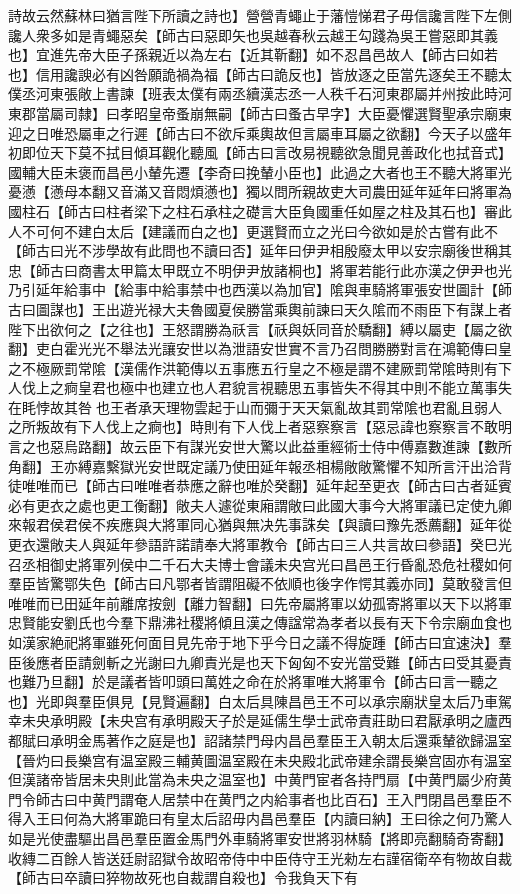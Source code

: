 詩故云然蘇林曰猶言陛下所讀之詩也】營營青蠅止于藩愷悌君子毋信讒言陛下左側讒人衆多如是青蠅惡矣【師古曰惡即矢也吳越春秋云越王勾踐為吳王嘗惡即其義也】宜進先帝大臣子孫親近以為左右【近其靳翻】如不忍昌邑故人【師古曰如若也】信用讒諛必有凶咎願詭禍為福【師古曰詭反也】皆放逐之臣當先逐矣王不聽太僕丞河東張敞上書諫【班表太僕有兩丞續漢志丞一人秩千石河東郡屬并州按此時河東郡當屬司隸】曰孝昭皇帝蚤崩無嗣【師古曰蚤古早字】大臣憂懼選賢聖承宗廟東迎之日唯恐屬車之行遲【師古曰不欲斥乘輿故但言屬車耳屬之欲翻】今天子以盛年初即位天下莫不拭目傾耳觀化聽風【師古曰言改易視聽欲急聞見善政化也拭音式】國輔大臣未褒而昌邑小輦先遷【李奇曰挽輦小臣也】此過之大者也王不聽大將軍光憂懣【懣母本翻又音滿又音悶煩懣也】獨以問所親故吏大司農田延年延年曰將軍為國柱石【師古曰柱者梁下之柱石承柱之礎言大臣負國重任如屋之柱及其石也】審此人不可何不建白太后【建議而白之也】更選賢而立之光曰今欲如是於古嘗有此不【師古曰光不涉學故有此問也不讀曰否】延年曰伊尹相殷廢太甲以安宗廟後世稱其忠【師古曰商書太甲篇太甲既立不明伊尹放諸桐也】將軍若能行此亦漢之伊尹也光乃引延年給事中【給事中給事禁中也西漢以為加官】隂與車騎將軍張安世圖計【師古曰圖謀也】王出遊光禄大夫魯國夏侯勝當乘輿前諫曰天久隂而不雨臣下有謀上者陛下出欲何之【之往也】王怒謂勝為祅言【祅與妖同音於驕翻】縛以屬吏【屬之欲翻】吏白霍光光不舉法光讓安世以為泄語安世實不言乃召問勝勝對言在鴻範傳曰皇之不極厥罰常隂【漢儒作洪範傳以五事應五行皇之不極是謂不建厥罰常隂時則有下人伐上之痾皇君也極中也建立也人君貌言視聽思五事皆失不得其中則不能立萬事失在眊悖故其咎也王者承天理物雲起于山而彌于天天氣亂故其罰常隂也君亂且弱人之所叛故有下人伐上之痾也】時則有下人伐上者惡察察言【惡忌諱也察察言不敢明言之也惡烏路翻】故云臣下有謀光安世大驚以此益重經術士侍中傅嘉數進諫【數所角翻】王亦縛嘉繫獄光安世既定議乃使田延年報丞相楊敞敞驚懼不知所言汗出洽背徒唯唯而已【師古曰唯唯者恭應之辭也唯於癸翻】延年起至更衣【師古曰古者延賓必有更衣之處也更工衡翻】敞夫人遽從東廂謂敞曰此國大事今大將軍議已定使九卿來報君侯君侯不疾應與大將軍同心猶與無决先事誅矣【與讀曰豫先悉薦翻】延年從更衣還敞夫人與延年參語許諾請奉大將軍教令【師古曰三人共言故曰參語】癸巳光召丞相御史將軍列侯中二千石大夫博士會議未央宫光曰昌邑王行昏亂恐危社稷如何羣臣皆驚鄂失色【師古曰凡鄂者皆謂阻礙不依順也後字作愕其義亦同】莫敢發言但唯唯而已田延年前離席按劍【離力智翻】曰先帝屬將軍以幼孤寄將軍以天下以將軍忠賢能安劉氏也今羣下鼎沸社稷將傾且漢之傳諡常為孝者以長有天下令宗廟血食也如漢家絶祀將軍雖死何面目見先帝于地下乎今日之議不得旋踵【師古曰宜速決】羣臣後應者臣請劍斬之光謝曰九卿責光是也天下匈匈不安光當受難【師古曰受其憂責也難乃旦翻】於是議者皆叩頭曰萬姓之命在於將軍唯大將軍令【師古曰言一聽之也】光即與羣臣俱見【見賢遍翻】白太后具陳昌邑王不可以承宗廟狀皇太后乃車駕幸未央承明殿【未央宫有承明殿天子於是延儒生學士武帝責莊助曰君厭承明之廬西都賦曰承明金馬著作之庭是也】詔諸禁門母内昌邑羣臣王入朝太后還乘輦欲歸温室【晉灼曰長樂宫有温室殿三輔黄圖温室殿在未央殿北武帝建余謂長樂宫固亦有温室但漢諸帝皆居未央則此當為未央之温室也】中黄門宦者各持門扇【中黄門屬少府黄門令師古曰中黄門謂奄人居禁中在黄門之内給事者也比百石】王入門閉昌邑羣臣不得入王曰何為大將軍跪曰有皇太后詔毋内昌邑羣臣【内讀曰納】王曰徐之何乃驚人如是光使盡驅出昌邑羣臣置金馬門外車騎將軍安世將羽林騎【將即亮翻騎奇寄翻】收縳二百餘人皆送廷尉詔獄令故昭帝侍中中臣侍守王光勑左右謹宿衛卒有物故自裁【師古曰卒讀曰猝物故死也自裁謂自殺也】令我負天下有